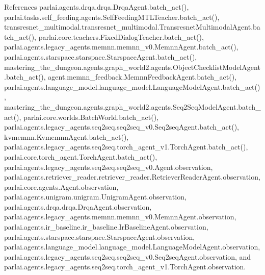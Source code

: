 References parlai.\+agents.\+drqa.\+drqa.\+Drqa\+Agent.\+batch\+\_\+act(), parlai.\+tasks.\+self\+\_\+feeding.\+agents.\+Self\+Feeding\+M\+T\+L\+Teacher.\+batch\+\_\+act(), transresnet\+\_\+multimodal.\+transresnet\+\_\+multimodal.\+Transresnet\+Multimodal\+Agent.\+batch\+\_\+act(), parlai.\+core.\+teachers.\+Fixed\+Dialog\+Teacher.\+batch\+\_\+act(), parlai.\+agents.\+legacy\+\_\+agents.\+memnn.\+memnn\+\_\+v0.\+Memnn\+Agent.\+batch\+\_\+act(), parlai.\+agents.\+starspace.\+starspace.\+Starspace\+Agent.\+batch\+\_\+act(), mastering\+\_\+the\+\_\+dungeon.\+agents.\+graph\+\_\+world2.\+agents.\+Object\+Checklist\+Model\+Agent.\+batch\+\_\+act(), agent.\+memnn\+\_\+feedback.\+Memnn\+Feedback\+Agent.\+batch\+\_\+act(), parlai.\+agents.\+language\+\_\+model.\+language\+\_\+model.\+Language\+Model\+Agent.\+batch\+\_\+act(), mastering\+\_\+the\+\_\+dungeon.\+agents.\+graph\+\_\+world2.\+agents.\+Seq2\+Seq\+Model\+Agent.\+batch\+\_\+act(), parlai.\+core.\+worlds.\+Batch\+World.\+batch\+\_\+act(), parlai.\+agents.\+legacy\+\_\+agents.\+seq2seq.\+seq2seq\+\_\+v0.\+Seq2seq\+Agent.\+batch\+\_\+act(), kvmemnn.\+Kvmemnn\+Agent.\+batch\+\_\+act(), parlai.\+agents.\+legacy\+\_\+agents.\+seq2seq.\+torch\+\_\+agent\+\_\+v1.\+Torch\+Agent.\+batch\+\_\+act(), parlai.\+core.\+torch\+\_\+agent.\+Torch\+Agent.\+batch\+\_\+act(), parlai.\+agents.\+legacy\+\_\+agents.\+seq2seq.\+seq2seq\+\_\+v0.\+Agent.\+observation, parlai.\+agents.\+retriever\+\_\+reader.\+retriever\+\_\+reader.\+Retriever\+Reader\+Agent.\+observation, parlai.\+core.\+agents.\+Agent.\+observation, parlai.\+agents.\+unigram.\+unigram.\+Unigram\+Agent.\+observation, parlai.\+agents.\+drqa.\+drqa.\+Drqa\+Agent.\+observation, parlai.\+agents.\+legacy\+\_\+agents.\+memnn.\+memnn\+\_\+v0.\+Memnn\+Agent.\+observation, parlai.\+agents.\+ir\+\_\+baseline.\+ir\+\_\+baseline.\+Ir\+Baseline\+Agent.\+observation, parlai.\+agents.\+starspace.\+starspace.\+Starspace\+Agent.\+observation, parlai.\+agents.\+language\+\_\+model.\+language\+\_\+model.\+Language\+Model\+Agent.\+observation, parlai.\+agents.\+legacy\+\_\+agents.\+seq2seq.\+seq2seq\+\_\+v0.\+Seq2seq\+Agent.\+observation, and parlai.\+agents.\+legacy\+\_\+agents.\+seq2seq.\+torch\+\_\+agent\+\_\+v1.\+Torch\+Agent.\+observation.

